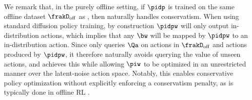 We remark that, in the purely offline setting, if $\pidp$ is trained on the same offline dataset $\frakD_{\mathrm{off}}$ as \algnamena, then \algnamena naturally handles conservatism. When using standard diffusion policy training, by construction $\pidpw$ will only output in-distribution actions, which implies that any $\bw$ will be mapped by $\pidpw$ to an in-distribution action. Since \algnamena only queries $\Qa$ on actions in $\frakD_{\mathrm{off}}$ and actions produced by $\pidpw$, it therefore naturally avoids querying the value of unseen actions, and achieves this while allowing $\piw$ to be optimized in an unrestricted manner over the latent-noise action space. 
Notably, this enables conservative policy optimization without explicitly enforcing a conservatism penalty, as is typically done in offline RL \cite{kumar2020conservative,kostrikov2021offline,jin2021pessimism,xie2021bellman}. 

